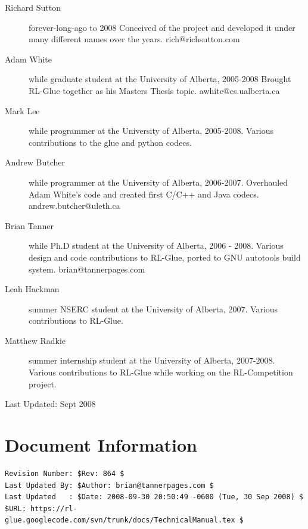 \documentclass[11pt]{article}
\begin{document}
\begin{description}
\item[Richard Sutton]  forever-long-ago to 2008\newline
Conceived of the project and developed it under many different names over the years.\newline
rich@richsutton.com

\item[Adam White] while graduate student at the University of Alberta, 2005-2008\newline
Brought RL-Glue together as his Masters Thesis topic.\newline
awhite@cs.ualberta.ca

\item[Mark Lee] while programmer at the University of Alberta, 2005-2008.\newline
Various contributions to the glue and python codecs.

\item[Andrew Butcher] while programmer at the University of Alberta, 2006-2007.\newline
Overhauled Adam White's code and created first C/C++ and Java codecs.\newline
andrew.butcher@uleth.ca

\item[Brian Tanner] while Ph.D student at the University of Alberta, 2006 - 2008.\newline
Various design and code contributions to RL-Glue, ported to GNU autotools build system.\newline
brian@tannerpages.com

\item[Leah Hackman] summer NSERC student at the University of Alberta, 2007.\newline
Various contributions to RL-Glue.

\item[Matthew Radkie] summer internship student at the University of Alberta, 2007-2008.\newline
Various contributions to RL-Glue while working on the RL-Competition project.
\end{description}
Last Updated:  Sept 2008
\section*{Document Information}
\begin{verbatim}
Revision Number: $Rev: 864 $
Last Updated By: $Author: brian@tannerpages.com $
Last Updated   : $Date: 2008-09-30 20:50:49 -0600 (Tue, 30 Sep 2008) $
$URL: https://rl-glue.googlecode.com/svn/trunk/docs/TechnicalManual.tex $
\end{verbatim}
\end{document}
